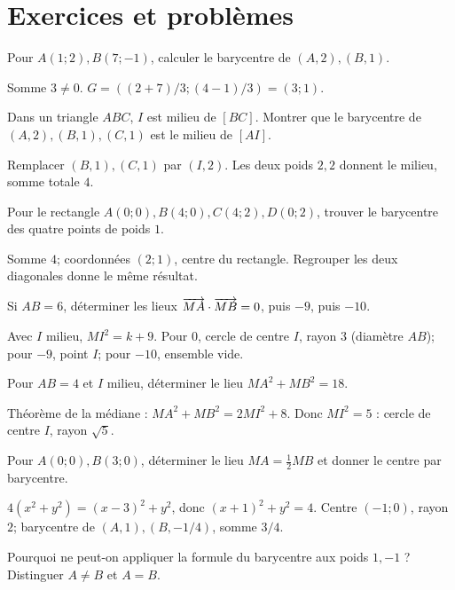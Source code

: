 \section{Exercices et problèmes}
\label{t11s-c14-e01}
Pour $A(1;2),B(7;-1)$, calculer le barycentre de $(A,2),(B,1)$.
\begin{corrige}\label{sol-t11s-c14-e01}
Somme $3\ne0$. $G=((2+7)/3;(4-1)/3)=(3;1)$.
\end{corrige}
\exo[Regrouper]\label{t11s-c14-e02}
Dans un triangle $ABC$, $I$ est milieu de $[BC]$. Montrer que le barycentre de $(A,2),(B,1),(C,1)$ est le milieu de $[AI]$.
\begin{corrige}\label{sol-t11s-c14-e02}
Remplacer $(B,1),(C,1)$ par $(I,2)$. Les deux poids $2,2$ donnent le milieu, somme totale $4$.
\end{corrige}
\label{t11s-c14-e03}
Pour le rectangle $A(0;0),B(4;0),C(4;2),D(0;2)$, trouver le barycentre des quatre points de poids $1$.
\begin{corrige}\label{sol-t11s-c14-e03}
Somme $4$; coordonnées $(2;1)$, centre du rectangle. Regrouper les deux diagonales donne le même résultat.
\end{corrige}
\label{t11s-c14-e04}
Si $AB=6$, déterminer les lieux $\overrightarrow{MA}\cdot\overrightarrow{MB}=0$, puis $-9$, puis $-10$.
\begin{corrige}\label{sol-t11s-c14-e04}
Avec $I$ milieu, $MI^2=k+9$. Pour $0$, cercle de centre $I$, rayon $3$ (diamètre $AB$); pour $-9$, point $I$; pour $-10$, ensemble vide.
\end{corrige}
\label{t11s-c14-e05}
Pour $AB=4$ et $I$ milieu, déterminer le lieu $MA^2+MB^2=18$.
\begin{corrige}\label{sol-t11s-c14-e05}
Théorème de la médiane : $MA^2+MB^2=2MI^2+8$. Donc $MI^2=5$ : cercle de centre $I$, rayon $\sqrt5$.
\end{corrige}
\exo[Apollonius]\label{t11s-c14-e06}
Pour $A(0;0),B(3;0)$, déterminer le lieu $MA=\tfrac12 MB$ et donner le centre par barycentre.
\begin{corrige}\label{sol-t11s-c14-e06}
$4(x^2+y^2)=(x-3)^2+y^2$, donc $(x+1)^2+y^2=4$. Centre $(-1;0)$, rayon $2$; barycentre de $(A,1),(B,-1/4)$, somme $3/4$.
\end{corrige}
\label{t11s-c14-e07}
Pourquoi ne peut-on appliquer la formule du barycentre aux poids $1,-1$ ? Distinguer $A\ne B$ et $A=B$.
